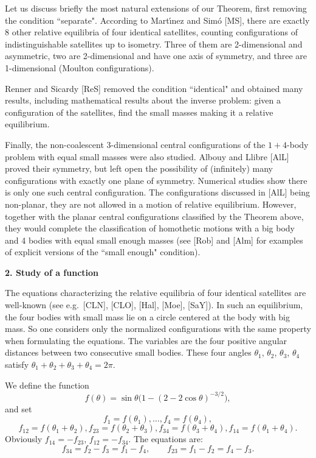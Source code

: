 \documentclass[11pt]{article}
\begin{document}
Let us discuss briefly the most natural extensions of our Theorem, first removing the condition ``separate". According to Mart\'\i nez and Sim\'o [MS], there are exactly 8 other relative equilibria of four identical satellites, counting configurations of indistinguishable satellites up to isometry. Three of them are 2-dimensional and asymmetric, two are 2-dimensional and have one axis of symmetry, and three are 1-dimensional (Moulton configurations).

Renner and Sicardy [ReS] removed the condition ``identical" and obtained many results, including mathematical results about the inverse problem: given a configuration of the satellites, find the small masses making it a relative equilibrium.

Finally, the non-coalescent 3-dimensional central configurations of the $1+4$-body problem with equal small masses were also studied. Albouy and Llibre [AlL] proved their symmetry, but left open the possibility of (infinitely) many configurations with exactly one plane of symmetry. Numerical studies show there is only one such central configuration. The configurations discussed in [AlL] being non-planar, they are not allowed in a motion of relative equilibrium. However, together with
the planar central configurations classified by the Theorem above,
they would complete the classification of homothetic motions with a
big body and 4 bodies with equal small enough masses (see [Rob] and
[Alm] for examples of explicit versions of the ``small enough" condition).





\bigskip
\centerline{\bf 2. Study of a function}

The equations characterizing the relative equilibria of four
identical satellites are well-known (see e.g.\ [CLN], [CLO], [Hal],
[Moe], [SaY]). In such an equilibrium, the four bodies with small
mass lie on a circle centered at the body with big mass. So one considers only the normalized configurations with the same property when formulating the equations. The variables are the four positive angular distances between two consecutive small bodies. These four angles $\theta_1$, $\theta_2$, $\theta_3$, $\theta_4$ satisfy $\theta_1+\theta_2+\theta_3+\theta_4=2\pi$.

We define the function
\begin{equation}\label{fun}
f(\theta)=\sin\theta\bigl(1-(2-2\cos\theta)^{-3/2}\bigr),
\end{equation}
and set $$f_1=f(\theta_1),\dots,f_4=f(\theta_4),$$
$$f_{12}=f(\theta_1+\theta_2),f_{23}=f(\theta_2+\theta_3),f_{34}=f(\theta_3+\theta_4),
f_{14}=f(\theta_1+\theta_4).$$ Obviously $f_{14}=-f_{23}$,
$f_{12}=-f_{34}$. The equations are:
\begin{equation}\label{cc}
f_{34}=f_2-f_3=f_1-f_4,\qquad f_{23}=f_1-f_2=f_4-f_3.
\end{equation}
\end{document}

